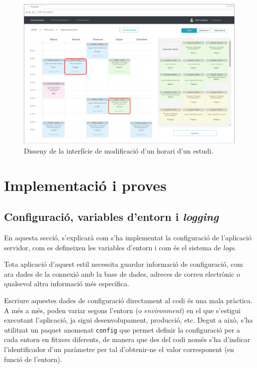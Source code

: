 \documentclass[a4paper,12pt]{ThesisStyle}
\begin{document}
\begin{figure}[H]
  \centering
  \includegraphics[width=\textwidth]{assets/interfaces/horaris/modif.pdf}
  \caption{\label{img:horaris_modif}Disseny de la interfície de modificació d'un horari d'un estudi.}
\end{figure}


\chapter{Implementació i proves}
\label{cap:implementacio}

\section{Configuració, variables d'entorn i \textit{logging}}
\label{sec:configuracio_servidor}

En aquesta secció, s'explicarà com s'ha implementat la configuració de l'aplicació servidor, com es defineixen les variables d'entorn i com és el sistema de \textit{logs}.

Tota aplicació d'aquest estil necessita guardar informació de configuració, com ara dades de la connexió amb la base de dades, adreces de correu electrònic o qualsevol altra informació més específica.

Escriure aquestes dades de configuració directament al codi és una mala pràctica. A més a més, poden variar segons l'entorn (o \textit{environment}) en el que s'estigui executant l'aplicació, ja sigui desenvolupament, producció, etc. Degut a això, s'ha utilitzat un paquet anomenat \texttt{config} que permet definir la configuració per a cada entorn en fitxers diferents, de manera que des del codi només s'ha d'indicar l'identificador d'un paràmetre per tal d'obtenir-ne el valor corresponent (en funció de l'entorn).
\end{document}
